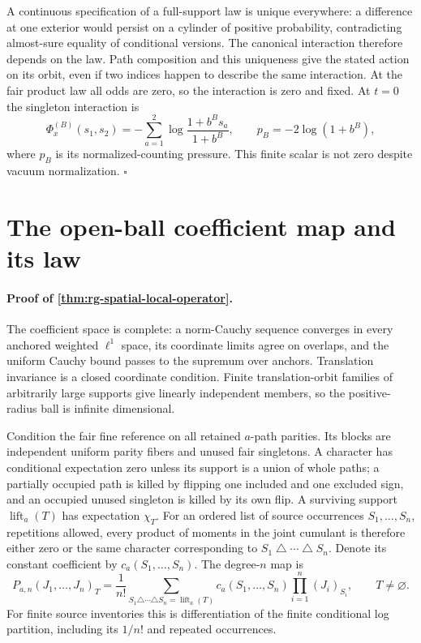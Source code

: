 A continuous specification of a full-support law is unique everywhere:
a difference at one exterior would persist on a cylinder of positive
probability, contradicting almost-sure equality of conditional versions.
The canonical interaction therefore depends on the law. Path composition
and this uniqueness give the stated action on its orbit, even if two
indices happen to describe the same interaction. At the fair product law
all odds are zero, so the interaction is zero and fixed. At \(t=0\) the
singleton interaction is
\begin{equation}
 \Phi_x^{(B)}(s_1,s_2)=-\sum_{a=1}^2
       \log\frac{1+b^Bs_a}{1+b^B},\qquad
 p_B=-2\log(1+b^B),
 \label{eq:rg-spatial-proof-product-vacuum-scalar}
\end{equation}
where \(p_B\) is its normalized-counting pressure. This finite scalar is
not zero despite vacuum normalization. \hfill\(\square\)
\section{The open-ball coefficient map and its law}
\label{sec:rg-spatial-proof-operator}

\paragraph{Proof of \cref{thm:rg-spatial-local-operator}.}
The coefficient space is complete: a norm-Cauchy sequence converges in every
anchored weighted \(\ell^1\) space, its coordinate limits agree on overlaps,
and the uniform Cauchy bound passes to the supremum over anchors.
Translation invariance is a closed coordinate condition. Finite
translation-orbit families of arbitrarily large supports give linearly
independent members, so the positive-radius ball is infinite dimensional.

Condition the fair fine reference on all retained \(a\)-path parities.
Its blocks are independent uniform parity fibers and unused fair
singletons. A character has conditional expectation zero unless its support
is a union of whole paths; a partially occupied path is killed by flipping
one included and one excluded sign, and an occupied unused singleton is
killed by its own flip. A surviving support
\(\operatorname{lift}_a(T)\) has expectation \(\chi_T\).
For an ordered list of source occurrences \(S_1,\ldots,S_n\), repetitions
allowed, every product of moments in the joint cumulant is therefore either
zero or the same character corresponding to
\(S_1\mathbin\triangle\cdots\mathbin\triangle S_n\). Denote its constant
coefficient by \(c_a(S_1,\ldots,S_n)\). The degree-\(n\) map is
\begin{equation}
 P_{a,n}(J_1,\ldots,J_n)_T
 =\frac1{n!}\sum_{S_1\triangle\cdots\triangle S_n=\operatorname{lift}_a(T)}
 c_a(S_1,\ldots,S_n)\prod_{i=1}^n(J_i)_{S_i},\qquad T\ne\varnothing.
 \label{eq:rg-spatial-proof-cumulant-map}
\end{equation}
For finite source inventories this is differentiation of the finite
conditional log partition, including its \(1/n!\) and repeated occurrences.

